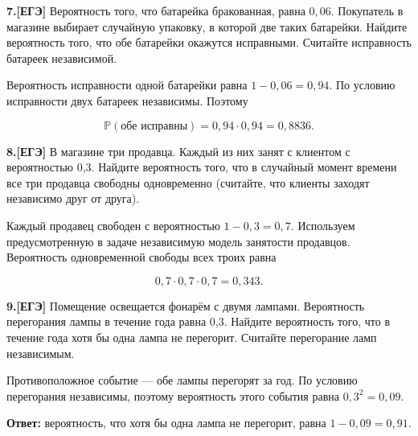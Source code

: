 \begin{task}\label{task-problems-4}
\textbf{7.[ЕГЭ]} Вероятность того, что батарейка бракованная, равна $0,06$. Покупатель в магазине выбирает случайную упаковку, в которой две таких батарейки. Найдите вероятность того, что обе батарейки окажутся исправными. Считайте исправность батареек независимой.
\end{task}

\begin{solution}\label{solution-independent-events-problems-4}
Вероятность исправности одной батарейки равна $1-0,06=0,94$. По условию исправности двух батареек независимы. Поэтому

\[\mathbb P(\text{обе исправны})=0,94\cdot0,94=0,8836.\]
\end{solution}

\begin{task}\label{task-problems-5}
\textbf{8.[ЕГЭ]} В магазине три продавца. Каждый из них занят с клиентом с вероятностью 0,3. Найдите вероятность того, что в случайный момент времени все три продавца свободны одновременно (считайте, что клиенты заходят независимо друг от друга).
\end{task}

\begin{solution}\label{solution-independent-events-problems-5}
Каждый продавец свободен с вероятностью $1-0,3=0,7$. Используем предусмотренную в задаче независимую модель занятости продавцов. Вероятность одновременной свободы всех троих равна

\[0,7\cdot0,7\cdot0,7=0,343.\]
\end{solution}

\begin{task}\label{task-problems-6}
\textbf{9.[ЕГЭ]} Помещение освещается фонарём с двумя лампами. Вероятность перегорания лампы в течение года равна 0,3. Найдите вероятность того, что в течение года хотя бы одна лампа не перегорит. Считайте перегорание ламп независимым.
\end{task}

\begin{solution}\label{solution-independent-events-problems-6}
Противоположное событие — обе лампы перегорят за год. По условию перегорания независимы, поэтому вероятность этого события равна $0,3^2=0,09$.

\textbf{Ответ:} вероятность, что хотя бы одна лампа не перегорит, равна $1-0,09=0,91$.
\end{solution}

